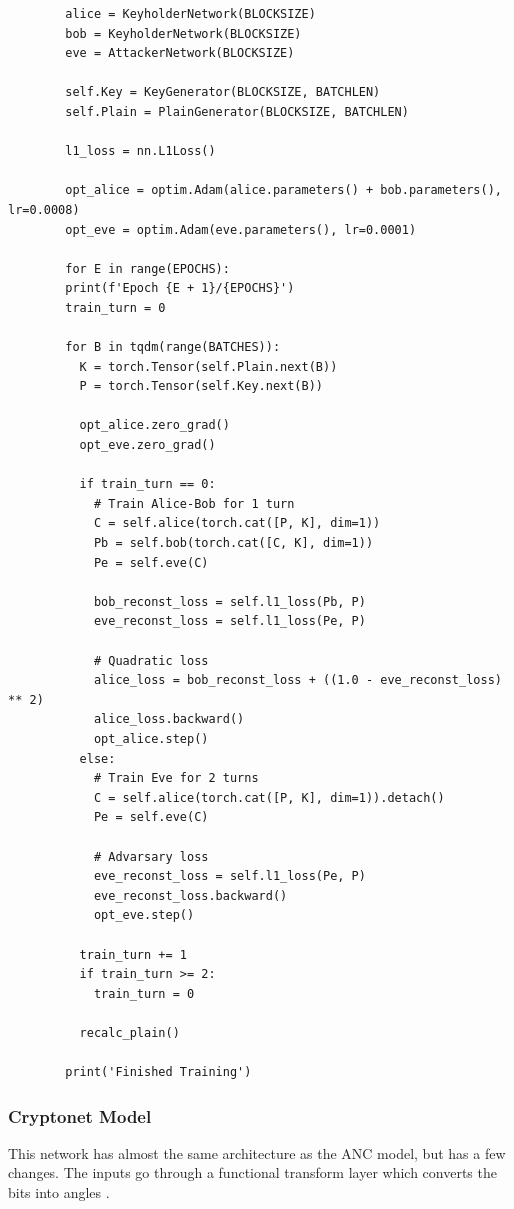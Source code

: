\documentclass[a4paper]{article}
\begin{document}
      \pagebreak
      \begin{lstlisting}
        alice = KeyholderNetwork(BLOCKSIZE)
        bob = KeyholderNetwork(BLOCKSIZE)
        eve = AttackerNetwork(BLOCKSIZE)

        self.Key = KeyGenerator(BLOCKSIZE, BATCHLEN)
        self.Plain = PlainGenerator(BLOCKSIZE, BATCHLEN)

        l1_loss = nn.L1Loss()

        opt_alice = optim.Adam(alice.parameters() + bob.parameters(), lr=0.0008)
        opt_eve = optim.Adam(eve.parameters(), lr=0.0001)

        for E in range(EPOCHS):
        print(f'Epoch {E + 1}/{EPOCHS}')
        train_turn = 0
  
        for B in tqdm(range(BATCHES)):  
          K = torch.Tensor(self.Plain.next(B))
          P = torch.Tensor(self.Key.next(B))
  
          opt_alice.zero_grad()
          opt_eve.zero_grad()
  
          if train_turn == 0:
            # Train Alice-Bob for 1 turn
            C = self.alice(torch.cat([P, K], dim=1))
            Pb = self.bob(torch.cat([C, K], dim=1))
            Pe = self.eve(C)
  
            bob_reconst_loss = self.l1_loss(Pb, P)
            eve_reconst_loss = self.l1_loss(Pe, P)
  
            # Quadratic loss
            alice_loss = bob_reconst_loss + ((1.0 - eve_reconst_loss) ** 2)
            alice_loss.backward()
            opt_alice.step()
          else:
            # Train Eve for 2 turns
            C = self.alice(torch.cat([P, K], dim=1)).detach()
            Pe = self.eve(C)
  
            # Advarsary loss
            eve_reconst_loss = self.l1_loss(Pe, P)
            eve_reconst_loss.backward()
            opt_eve.step()
  
          train_turn += 1
          if train_turn >= 2:
            train_turn = 0

          recalc_plain()

        print('Finished Training')
      \end{lstlisting}

      \pagebreak
      \subsubsection{Cryptonet Model}
      This network has almost the same architecture as the ANC model, but has a few changes.
      The inputs go through a functional transform layer which converts the bits into angles \cite{perfanc}.
      
\end{document}
